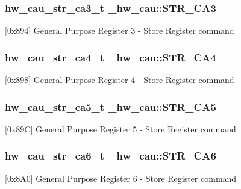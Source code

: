 \subsubsection[{\texorpdfstring{S\+T\+R\+\_\+\+C\+A3}{STR_CA3}}]{ {\bf hw\+\_\+cau\+\_\+str\+\_\+ca3\+\_\+t} \+\_\+hw\+\_\+cau\+::\+S\+T\+R\+\_\+\+C\+A3}\hypertarget{struct__hw__cau_a3f24db2006603908802fe0e0f9d99c99}{}\label{struct__hw__cau_a3f24db2006603908802fe0e0f9d99c99}
\mbox{[}0x894\mbox{]} General Purpose Register 3 -\/ Store Register command 
\subsubsection[{\texorpdfstring{S\+T\+R\+\_\+\+C\+A4}{STR_CA4}}]{ {\bf hw\+\_\+cau\+\_\+str\+\_\+ca4\+\_\+t} \+\_\+hw\+\_\+cau\+::\+S\+T\+R\+\_\+\+C\+A4}\hypertarget{struct__hw__cau_afb43f4a454df1ee6d12ca5f6b7bb65fc}{}\label{struct__hw__cau_afb43f4a454df1ee6d12ca5f6b7bb65fc}
\mbox{[}0x898\mbox{]} General Purpose Register 4 -\/ Store Register command 
\subsubsection[{\texorpdfstring{S\+T\+R\+\_\+\+C\+A5}{STR_CA5}}]{ {\bf hw\+\_\+cau\+\_\+str\+\_\+ca5\+\_\+t} \+\_\+hw\+\_\+cau\+::\+S\+T\+R\+\_\+\+C\+A5}\hypertarget{struct__hw__cau_a2ea105256516d8b74b7c7498905a0237}{}\label{struct__hw__cau_a2ea105256516d8b74b7c7498905a0237}
\mbox{[}0x89C\mbox{]} General Purpose Register 5 -\/ Store Register command 
\subsubsection[{\texorpdfstring{S\+T\+R\+\_\+\+C\+A6}{STR_CA6}}]{ {\bf hw\+\_\+cau\+\_\+str\+\_\+ca6\+\_\+t} \+\_\+hw\+\_\+cau\+::\+S\+T\+R\+\_\+\+C\+A6}\hypertarget{struct__hw__cau_a29c4e6f96a1c2bbce5ebba2551c6e0b5}{}\label{struct__hw__cau_a29c4e6f96a1c2bbce5ebba2551c6e0b5}
\mbox{[}0x8\+A0\mbox{]} General Purpose Register 6 -\/ Store Register command 
